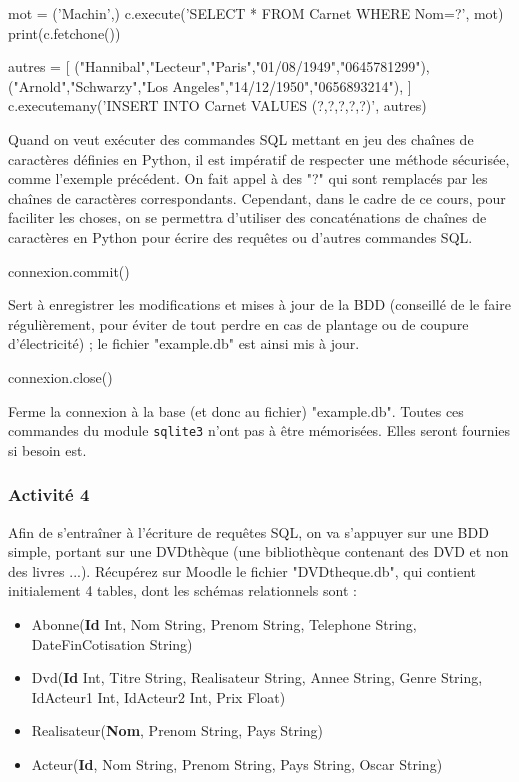 \documentclass[french,11pt,twoside]{VcCours}
\begin{document}
\begin{Python}
mot = ('Machin',)
c.execute('SELECT * FROM Carnet WHERE Nom=?', mot)
print(c.fetchone())

autres = [
  ("Hannibal","Lecteur","Paris","01/08/1949","0645781299"),
  ("Arnold","Schwarzy","Los Angeles","14/12/1950","0656893214"),
]
c.executemany('INSERT INTO Carnet VALUES (?,?,?,?,?)', autres)
\end{Python}

Quand on veut exécuter des commandes SQL mettant en jeu des chaînes de caractères définies en Python, il est impératif de respecter une méthode sécurisée, comme l'exemple précédent. On fait appel à des "?" qui sont remplacés par les chaînes de caractères correspondants. Cependant, dans le cadre de ce cours, pour faciliter les choses, on se permettra d'utiliser des concaténations de chaînes de caractères en Python pour écrire des requêtes ou d'autres commandes SQL.

\begin{Python}
connexion.commit()
\end{Python}
Sert à enregistrer les modifications et mises à jour de la BDD (conseillé de le faire régulièrement, pour éviter de tout perdre en cas de plantage ou de coupure d'électricité) ; le fichier "example.db" est ainsi mis à jour.

\begin{Python}
connexion.close()
\end{Python}
Ferme la connexion à la base (et donc au fichier) "example.db". Toutes ces commandes du module \verb'sqlite3' n'ont pas à être mémorisées. Elles seront fournies si besoin est.



\subsubsection*{Activité 4}

Afin de s'entraîner à l'écriture de requêtes SQL, on va s'appuyer sur une BDD simple, portant sur une DVDthèque (une bibliothèque contenant des DVD et non des livres ...). Récupérez sur Moodle le fichier "DVDtheque.db", qui contient initialement 4 tables, dont les schémas relationnels sont :
\begin{itemize}
 \item Abonne(\textbf{Id} Int, Nom String, Prenom String, Telephone String, DateFinCotisation String)
 \item Dvd(\textbf{Id} Int, Titre String, Realisateur String, Annee String, Genre String, IdActeur1 Int, IdActeur2 Int, Prix Float)
 \item Realisateur(\textbf{Nom}, Prenom String, Pays String)
 \item Acteur(\textbf{Id}, Nom String, Prenom String, Pays String, Oscar String)
\end{itemize}
\end{document}
